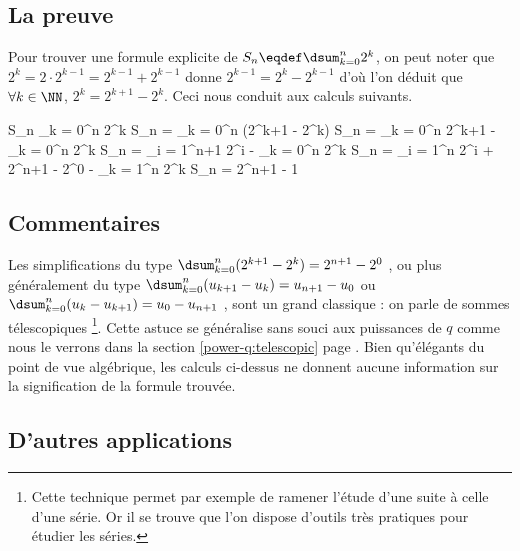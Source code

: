 \subsection{La preuve}

Pour trouver une formule explicite de $S_n \eqdef \dsum_{k = 0}^{n} 2^k$, on peut noter que
$2^k = 2 \cdot 2^{k-1} = 2^{k-1} + 2^{k-1}$
donne
$2^{k-1} = 2^k - 2^{k-1}$
d'où l'on déduit que
$\forall k \in \NN$, $2^k = 2^{k+1} - 2^k$.
Ceci nous conduit aux calculs suivants.

\medskip

\begin{explain}[style = sar, ope = \iff]
	S_n \eqdef \dsum_{k = 0}^{n} 2^k
		\explnext{}
	S_n = \dsum_{k = 0}^{n} (2^{k+1} - 2^k)
		\explnext{}
	S_n = \dsum_{k = 0}^{n} 2^{k+1} - \dsum_{k = 0}^{n} 2^k
	S_n = \dsum_{i = 1}^{n+1} 2^{i} - \dsum_{k = 0}^{n} 2^k
	S_n = \dsum_{i = 1}^{n} 2^{i} + 2^{n+1} - 2^0 - \dsum_{k = 1}^{n} 2^k
		\explnext{}
	S_n = 2^{n+1} - 1
\end{explain}




\subsection{Commentaires}

Les simplifications du type
$\dsum_{k = 0}^{n} (2^{k+1} - 2^k) = 2^{n+1} - 2^0$ ,
ou plus généralement du type
$\dsum_{k = 0}^{n} (u_{k+1} - u_{k}) = u_{n+1} - u_0$
ou
$\dsum_{k = 0}^{n} (u_{k} - u_{k+1}) = u_0 - u_{n+1}$ ,
sont un grand classique : on parle de \og sommes télescopiques \fg{}
\footnote{
	Cette technique permet par exemple de ramener l'étude d'une suite à celle d'une série.
	Or il se trouve que l'on dispose d'outils très pratiques pour étudier les séries.
}.
Cette astuce se généralise sans souci aux puissances de $q$ comme nous le verrons dans la section \ref{power-q:telescopic} page \pageref{power-q:telescopic}.
Bien qu'élégants du point de vue algébrique, les calculs ci-dessus ne donnent aucune information sur la signification de la formule trouvée.




\subsection{D'autres applications}

